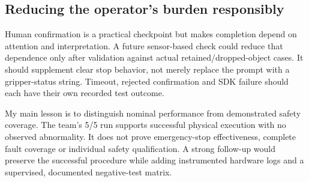 \subsection{Reducing the operator's burden responsibly}
Human confirmation is a practical checkpoint but makes completion depend on attention and interpretation. A future sensor-based check could reduce that dependence only after validation against actual retained/dropped-object cases. It should supplement clear stop behavior, not merely replace the  prompt with a gripper-status string. Timeout, rejected confirmation and SDK failure should each have their own recorded test outcome.

My main lesson is to distinguish nominal performance from demonstrated safety coverage. The team's 5/5 run supports successful physical execution with no observed abnormality. It does not prove emergency-stop effectiveness, complete fault coverage or individual safety qualification. A strong follow-up would preserve the successful procedure while adding instrumented hardware logs and a supervised, documented negative-test matrix.
\githubsection
{}

